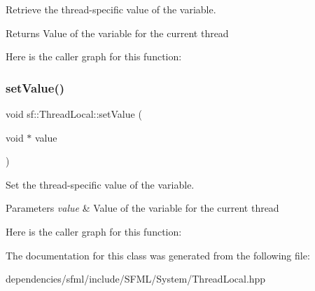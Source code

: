 Retrieve the thread-\/specific value of the variable. 

\begin{DoxyReturn}{Returns}
Value of the variable for the current thread 
\end{DoxyReturn}
Here is the caller graph for this function\+:
\mbox{\label{classsf_1_1_thread_local_ab7e334c83d77644a8e67ee31c3230007}} 
\subsubsection{\texorpdfstring{set\+Value()}{setValue()}}
{\footnotesize\ttfamily void sf\+::\+Thread\+Local\+::set\+Value (\begin{DoxyParamCaption}\item[{void $\ast$}]{value }\end{DoxyParamCaption})}



Set the thread-\/specific value of the variable. 


\begin{DoxyParams}{Parameters}
{\em value} & Value of the variable for the current thread \\
\hline
\end{DoxyParams}
Here is the caller graph for this function\+:


The documentation for this class was generated from the following file\+:\begin{DoxyCompactItemize}
\item 
dependencies/sfml/include/\+S\+F\+M\+L/\+System/Thread\+Local.\+hpp\end{DoxyCompactItemize}
